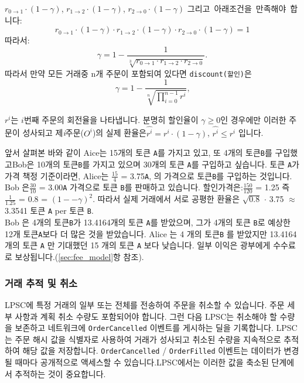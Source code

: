 \documentclass{article}
\begin{document}
\begin{multicols}{2}
$r_{0\rightarrow 1} \cdot (1-\gamma)$, $r_{1\rightarrow 2} \cdot (1-\gamma)$, $r_{2 \rightarrow 0} \cdot (1-\gamma)$
그리고\ 아래조건을\ 만족해야\ 합니다:\\
\begin{equation}
r_{0\rightarrow 1} \cdot (1-\gamma)\cdot r_{1\rightarrow 2} \cdot (1-\gamma) \cdot r_{2 \rightarrow 0} \cdot (1-\gamma) = 1
\end{equation}
따라서:\\
\begin{equation}
\gamma = 1- \frac{1}{\sqrt[3]{r_{0\rightarrow 1} \cdot r_{1\rightarrow 2} \cdot r_{2\rightarrow 0}}}\text{.}
\end{equation}
\indent 따라서 만약 모든 거래중 n개 주문이 포함되여 있다면 \texttt{discount(할인)}은\\
\begin{equation}
\gamma = 1- \frac{1}{\sqrt[n]{\prod_{i=0}^{n-1} r^i}} \text{,}
\end{equation}

 $r^i$는 $i$번째 주문의 회전율을 나타냅니다. 분명히 할인율이 $\gamma \ge 0$인 경우에만 이러한 주문이 성사되고 제\textit{i}주문($O^i$)의 실제 환율은$\hat{r^i} = r^i \cdot (1-\gamma)$, $\hat{r^i}\le r^i$ 입니다.
 
\indent 앞서 살펴본 바와 같이  Aice는 15개의 토큰 \verb|A|를 가지고 있고, 또 4개의 토큰\verb|B|를 구입했고Bob은 10개의 토큰\verb|B|를 가지고 있으며 30개의 토큰 \verb|A|를 구입하고 싶습니다. 토큰 \verb|A|가 가격 책정 기준이라면, Alice는 $\frac{15}{4}$ = 3.75\verb|A|, 의 가격으로 토큰\verb|B|를 구입하는 것입니다. Bob 은$\frac{30}{10}$ = 3.00\verb|A| 가격으로 토큰 \verb|B|를 판매하고 있습니다. 할인가격은:$\frac{150}{120}$ = 1.25 즉 $\frac{1}{1.25}$ = 0.8 = $(1 −- \gamma)^2$. 따라서 실제 거래에서 서로 공평한 환율은 $\sqrt{0.8}$ $\cdot$ 3.75 $\approx$ 3.3541 토큰 \verb|A| per 토큰 \verb|B|.\\
\indent Bob 은 4개의 토큰\verb|B|가 13.4164개의 토큰 \verb|A|를 받았으며, 그가 4개의 토큰 \verb|B|로 예상한 12개 토큰\verb|A|보다 더 많은 것을 받았습니다. Alice 는 4 개의 토큰\verb|B| 를 받았지만 13.4164 개의 토큰 \verb|A| 만 기대했던 15 개의 토큰 \verb|A| 보다 낮습니다. 일부 이익은 광부에게 수수료로 보상됩니다.(\ref{sec:fee_model}항 참조). 


\subsubsection{거래 추적 및 취소}

\indent LPSC에 특정 거래의 일부 또는 전체를 전송하여 주문을 취소할 수 있습니다. 주문 세부 사항과 계획 취소 수량도 포함되어야 합니다. 그런 다음 LPSC는 취소해야 할 수량을 보존하고 네트워크에 \verb|OrderCancelled| 이벤트를 게시하는 딜을 기록합니다. LPSC는 주문 해시 값을 식별자로 사용하여 거래가 성사되고 취소된 수량을 지속적으로 추적하여 해당 값을 저장합니다. \verb|OrderCancelled| / \verb|OrderFilled| 이벤트는 데이터가 변경될 때마다 공개적으로 액세스할 수 있습니다.LPSC에서는 이러한 값을 축소된 단계에서 추적하는 것이 중요합니다.


\end{multicols}
\end{document}
